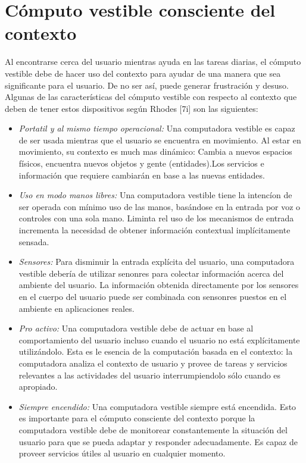 \documentclass[letterpaper,12pt]{cicese}
\begin{document}
			\section{C\'omputo vestible consciente del contexto}
				Al encontrarse cerca del usuario mientras ayuda en las tareas diarias, el c\'omputo vestible debe de hacer uso del contexto para ayudar de una manera
				que sea significante para el usuario. De no ser as\'i, puede generar frustraci\'on y desuso. Algunas de las caracter\'isticas del c\'omputo vestible
				con respecto al contexto que deben de tener estos dispositivos seg\'un Rhodes [7i] son las siguientes:
				\begin{itemize}
					\item{\emph{Portatil y al mismo tiempo operacional:}} Una computadora vestible es capaz de ser usada mientras que el usuario se encuentra
					en movimiento. Al estar en movimiento, su contexto es much mas din\'amico: Cambia a nuevos espacios f\'isicos, encuentra nuevos objetos 
					y gente (entidades).Los servicios e informaci\'on que requiere cambiar\'an en base a las nuevas entidades.
				\end{itemize}
				\begin{itemize}
					\item{\emph{Uso en modo manos libres:}} Una computadora vestible tiene la intenc\'ion de ser operada con m\'inimo uso de las manos,
					bas\'andose en la entrada por voz o controles con una sola mano. Liminta rel uso de los mecanismos de entrada incrementa la necesidad
					de obtener informaci\'on contextual impl\'icitamente sensada.
				\end{itemize}
				\begin{itemize}
					\item{\emph{Sensores:}} Para disminuir la entrada expl\'icita del usuario, una computadora vestible deber\'ia de utilizar senonres para
					colectar informaci\'on acerca del ambiente del usuario. La informaci\'on obtenida directamente por los sensores en el cuerpo del
					usuario puede ser combinada con sensonres puestos en el ambiente en aplicaciones reales.
				\end{itemize}
				\begin{itemize}
					\item{\emph{Pro activo:}} Una computadora vestible debe de actuar en base al comportamiento del usuario incluso cuando el usuario no
					est\'a expl\'icitamente utiliz\'andolo. Esta es le esencia de la computaci\'on basada en el contexto: la computadora analiza el
					contexto de usuario y provee de tareas y servicios relevantes a las actividades del usuario interrumpiendolo s\'olo cuando es apropiado.
				\end{itemize}
				\begin{itemize}
					\item{\emph{Siempre encendido:}} Una computadora vestible siempre est\'a encendida. Esto es importante para el c\'omputo consciente del contexto
					porque la computadora vestible debe de monitorear constantemente la situaci\'on del usuario para que se pueda adaptar y responder
					adecuadamente. Es capaz de proveer servicios \'utiles al usuario en cualquier momento.
				\end{itemize}
\end{document}
